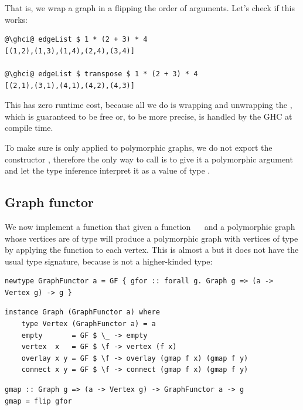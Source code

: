 \noindent
That is, we wrap a graph in a  flipping the order of  arguments.
Let's check if this works:

\begin{verbatim}
@\ghci@ edgeList $ 1 * (2 + 3) * 4
[(1,2),(1,3),(1,4),(2,4),(3,4)]

@\ghci@ edgeList $ transpose $ 1 * (2 + 3) * 4
[(2,1),(3,1),(4,1),(4,2),(4,3)]
\end{verbatim}

This has zero runtime cost, because all we do is wrapping and unwrapping
the , which is guaranteed to be free or, to be more precise, is handled
by the GHC at compile time.

To make sure  is only applied to polymorphic graphs, we do not export
the constructor , therefore the only way to call  is to give it a
polymorphic argument and let the type inference interpret it as a value of type
.

\subsection{Graph functor}\label{sub-functor}

We now implement a function  that given a function ~\hs{->}~
and a polymorphic graph whose vertices are of type  will produce a
polymorphic graph with vertices of type  by applying the function
to each vertex. This is almost a  but it does not have the usual
type signature, because  is not a higher-kinded type:

\vspace{2mm}
\begin{verbatim}
newtype GraphFunctor a = GF { gfor :: forall g. Graph g => (a -> Vertex g) -> g }
\end{verbatim}
\vspace{1mm}
\begin{verbatim}
instance Graph (GraphFunctor a) where
    type Vertex (GraphFunctor a) = a
    empty       = GF $ \_ -> empty
    vertex  x   = GF $ \f -> vertex (f x)
    overlay x y = GF $ \f -> overlay (gmap f x) (gmap f y)
    connect x y = GF $ \f -> connect (gmap f x) (gmap f y)
\end{verbatim}
\vspace{1mm}
\begin{verbatim}
gmap :: Graph g => (a -> Vertex g) -> GraphFunctor a -> g
gmap = flip gfor
\end{verbatim}

